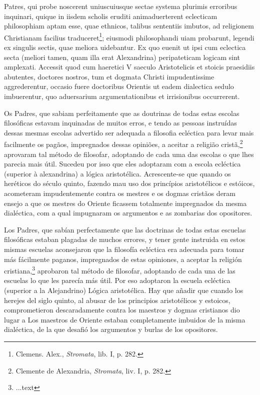 \documentclass{article}
\begin{document}
\begin{paracol}{3}
\begin{nthcolumn}{2}
\end{nthcolumn}
\vspace{0.5cm}
\begin{nthcolumn*}{0} %
  Patres, qui probe noscerent uniuscuiusque sectae systema plurimis erroribus inquinari, quique in iisdem scholis eruditi animaduerterent eclecticam philosophiam aptam esse, quae ethnicos, talibus sententiis imbutos, ad religionem Christianam facilius traduceret\footnote[45]{Clemens. Alex., \emph{Stromata}, lib. I, p. 282.}; eiusmodi philosophandi uiam probarunt, legendi ex singulis sectis, quae meliora uidebantur. Ex quo euenit ut ipsi cum eclectica secta (meliori tamen, quam illa erat Alexandrina) peripateticam logicam sint amplexati. Accessit quod cum haeretici V saeculo Aristotelicis et stoicis praesidiis abutentes, doctores nostros, tum et dogmata Christi impudentissime aggrederentur, occasio fuere doctoribus Orientis ut eadem dialectica sedulo imbuerentur, quo aduersarium argumentationibus et irrisionibus occurrerent.
\end{nthcolumn*}
\vspace{0.5cm}
\begin{nthcolumn}{1} %
  Os Padres, que sabiam perfeitamente que as doutrinas de todas estas escolas
  filosóficas estavam inquinadas de muitos erros, e tendo as pessoas instruídas dessas  mesmas escolas advertido ser adequada a filosofia ecléctica para levar mais facilmente  os pagãos, impregnados dessas opiniões, a aceitar a religião cristã,\footnote[45]{Clemente de Alexandria, \emph{Stromata}, liv. I, p. 282.} aprovaram tal método de filosofar, adoptando de cada uma das escolas o que lhes parecia mais útil. Sucedeu por isso que eles adoptaram com a escola ecléctica (superior à alexandrina) a lógica aristotélica. Acrescente-se que quando os heréticos do século
  quinto, fazendo mau uso dos princípios aristotélicos e estóicos, acometeram
  impudentemente contra os mestres e os dogmas cristãos deram ensejo a que os
  mestres do Oriente ficassem totalmente impregnados da mesma dialéctica, com a qual impugnaram os argumentos e as zombarias dos opositores.
\end{nthcolumn}
\vspace{0.5cm}
\begin{nthcolumn}{2} %
  Los Padres, que sabían perfectamente que las doctrinas de todas estas escuelas filosóficas estaban plagadas de muchos errores, y tener gente instruida en estos mismas escuelas aconsejaron que la filosofía ecléctica era adecuada para tomar más fácilmente paganos, impregnados de estas opiniones, a aceptar la religión cristiana,\footnote[45]{...text} aprobaron tal método de filosofar, adoptando de cada una de las escuelas lo que les parecía más útil. Por eso adoptaron la escuela ecléctica (superior a la Alejandrino) Lógica aristotélica. Hay que añadir que cuando los herejes del siglo  quinto, al abusar de los principios aristotélicos y estoicos, comprometieron descaradamente contra los maestros y dogmas cristianos dio lugar a Los maestros de Oriente estaban completamente imbuidos de la misma dialéctica, de la que desafió los argumentos y burlas de los opositores.

\end{nthcolumn}
\end{paracol}
\end{document}
